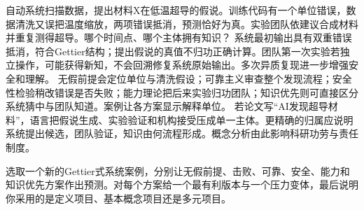 自动系统扫描数据，提出材料X在低温超导的假说。训练代码有一个单位错误，数据清洗又误把温度缩放，两项错误抵消，预测恰好为真。实验团队依建议合成材料并重复测得超导。哪个时间点、哪个主体拥有知识？ 系统最初输出具有双重错误抵消，符合Gettier结构；提出假说的真值不归功正确计算。团队第一次实验若独立操作，可能获得新知，不会回溯修复系统原始输出。多次异质复现进一步增强安全和理解。 无假前提会定位单位与清洗假设；可靠主义审查整个发现流程；安全性检验稍改错误是否失败；能力理论把后来实验归功团队；知识优先则可直接区分系统猜中与团队知道。案例让各方案显示解释单位。 若论文写“AI发现超导材料”，语言把假说生成、实验验证和机构接受压成单一主体。更精确的归属应说明系统提出候选，团队验证，知识由何流程形成。概念分析由此影响科研功劳与责任制度。

\begin{tcolorbox}[breakable,colback=white,colframe=blue!30!black,title={专题研讨任务},fonttitle=\bfseries]
选取一个新的Gettier式系统案例，分别让无假前提、击败、可靠、安全、能力和知识优先方案作出预测。对每个方案给一个最有利版本与一个压力变体，最后说明你采用的是定义项目、基本概念项目还是多元项目。
\end{tcolorbox}
